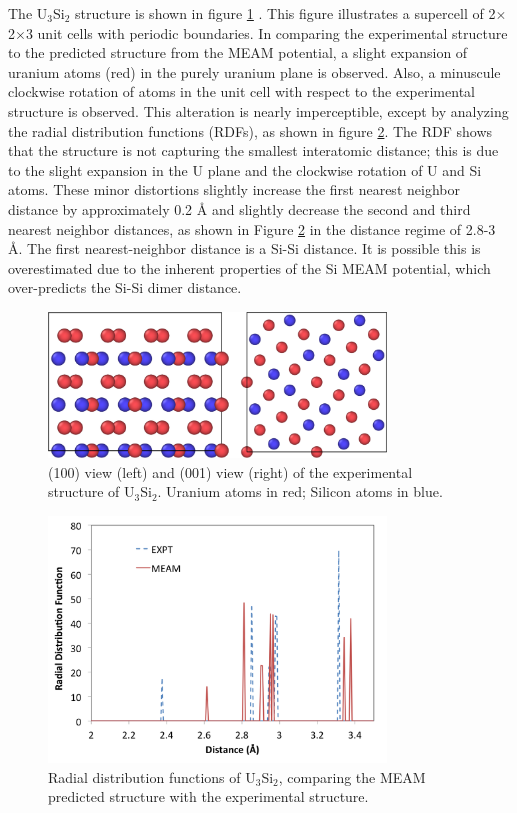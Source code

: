 \documentclass[review]{elsarticle}
\begin{document}
The U$_{3}$Si$_{2}$ structure is shown in figure \ref{fig:ben1} \cite{zachariasen1949}.  This figure illustrates a supercell of 2$\times$2$\times$3 unit cells with periodic boundaries.  In comparing the experimental structure to the predicted structure from the MEAM potential, a slight expansion of uranium atoms (red) in the purely uranium plane is observed.  Also, a minuscule clockwise rotation of atoms in the unit cell with respect to the experimental structure is observed.  This alteration is nearly imperceptible, except by analyzing the radial distribution functions (RDFs), as shown in figure \ref{fig:benrdf}.  The RDF shows that the structure is not capturing the smallest interatomic distance; this is due to the slight expansion in the U plane and the clockwise rotation of U and Si atoms.  These minor distortions slightly increase the first nearest neighbor distance by approximately 0.2 {\AA} and slightly decrease the second and third nearest neighbor distances, as shown in Figure \ref{fig:benrdf} in the distance regime of 2.8-3 {\AA}.  The first nearest-neighbor distance is a Si-Si distance.  It is possible this is overestimated due to the inherent properties of the Si MEAM potential, which over-predicts the Si-Si dimer distance.  

\begin{figure}[ht]
	\centering
	\includegraphics[width=0.8\textwidth]{ben1NEW.png}
    \caption{(100) view (left) and (001) view (right) of the experimental structure of U$_{3}$Si$_{2}$.  Uranium atoms in red; Silicon atoms in blue.}\label{fig:ben1}
\end{figure}  

\begin{figure}[ht]
	\centering
	\includegraphics[width=0.8\textwidth]{rdf_image1.png}
    \caption{Radial distribution functions of U$_{3}$Si$_{2}$, comparing the MEAM predicted structure with the experimental structure.}\label{fig:benrdf}
\end{figure}
\end{document}
